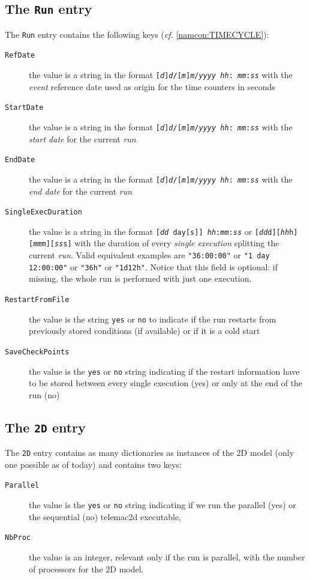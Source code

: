 \subsection{The \texttt{Run} entry}
The \texttt{Run} entry contains the following keys ({\em cf.} \ref{namcon:TIMECYCLE}):
\begin{description}
  \item[\texttt{RefDate}] the value is a string in the format
    \texttt{[{\em d}]{\em d}/[{\em m}]{\em m}/{\em yyyy} {\em hh}:{\em
        mm}:{\em ss}} with the {\em event} reference
    date used as origin for the time counters in seconds
  \item[\texttt{StartDate}] the value is a string in the format
    \texttt{[{\em d}]{\em d}/[{\em m}]{\em m}/{\em yyyy} {\em hh}:{\em
        mm}:{\em ss}} with the {\em start date} for the
    current {\em run}
  \item[\texttt{EndDate}] the value is a string in the format
    \texttt{[{\em d}]{\em d}/[{\em m}]{\em m}/{\em yyyy} {\em hh}:{\em
        mm}:{\em ss}} with the {\em end date} for the
    current {\em run}
  \item[\texttt{SingleExecDuration}] the value is a string in the format
    \texttt{[{\em dd} day[s]] {\em hh}:{\em mm}:{\em ss}} or
    \texttt{[{\em dd}d][{\em hh}h][{\em mm}m][{\em ss}s]} with the
    duration of every {\em single execution}
    splitting the current {\em run}. Valid equivalent examples are
    \texttt{"36:00:00"} or \texttt{"1 day 12:00:00"} or \texttt{"36h"}
    or \texttt{"1d12h"}. Notice that this field is optional: if
    missing, the whole run is performed with just one execution.
  \item[\texttt{RestartFromFile}] the value is the string \texttt{yes}
    or \texttt{no} to indicate if the run restarts from previously
    stored conditions (if available) or if it is a cold start
  \item[\texttt{SaveCheckPoints}] the value is the \texttt{yes} or
    \texttt{no} string indicating if the restart information have to
    be stored between every single execution (yes) or only at the end
    of the run (no)
\end{description}


\subsection{The \texttt{2D} entry}
The \texttt{2D} entry contains as many dictionaries as instances of the 2D
model (only one possible as of today) and contains two keys:
\begin{description}
  \item[\texttt{Parallel}] the value is the \texttt{yes} or
    \texttt{no} string indicating if we run the parallel (yes) or the
    sequential (no) telemac2d executable,
  \item[\texttt{NbProc}] the value is an integer, relevant only if the
    run is parallel, with the number of processors for the 2D model.
\end{description}


